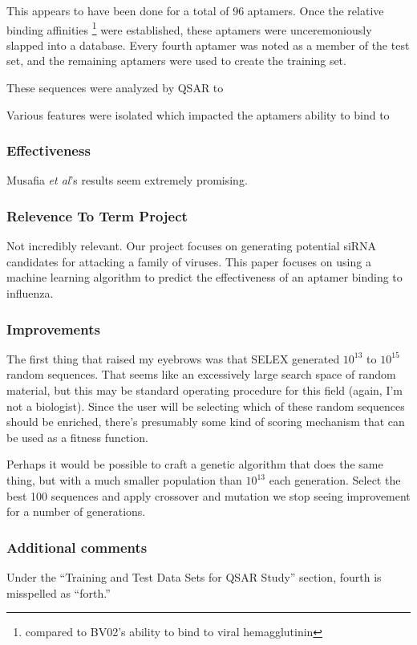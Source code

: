 \documentclass[10pt,a4paper]{article}
\begin{document}
	This appears to have been done for a total of 96 aptamers. 
	Once the relative binding affinities \footnote{compared to BV02's ability to bind to viral hemagglutinin} were established, these aptamers were unceremoniously slapped into a database.
	Every fourth aptamer was noted as a member of the test set, and the remaining aptamers were used to create the training set.
	
	
	These sequences were analyzed by QSAR to  
	
	Various features were isolated which impacted the aptamers ability to bind to  
	
	
	\subsubsection*{Effectiveness}
	Musafia \textit{et al}'s results seem extremely promising. \cite{musafia2014designing}
	\subsubsection*{Relevence To Term Project}
	Not incredibly relevant.  
	Our project focuses on generating potential siRNA candidates for attacking a family of viruses.
	This  paper focuses on  using a machine learning algorithm to predict the effectiveness of an aptamer binding to influenza.
	
	
	\subsubsection*{Improvements}
	The first thing that raised my eyebrows  was that SELEX generated $ 10^{13 }$  to $ 10^{15} $ random sequences.
	That seems like an excessively large search space of random material, but this may be standard operating procedure for this field (again, I'm not a biologist).
	Since the user will be selecting which of these random sequences should be enriched, there's presumably some kind of scoring mechanism that can be used as a fitness function.
	
	Perhaps it would be possible to craft a genetic algorithm that does the same thing, but with a much smaller population than $ 10^{13} $ each generation.
	Select the best 100 sequences and apply  crossover and mutation we stop seeing improvement for a number of generations.
	
	
	
	
	\subsubsection*{Additional comments}
	Under the ``Training and Test Data Sets for QSAR Study'' section, fourth is misspelled as ``forth.''
	
\end{document}
